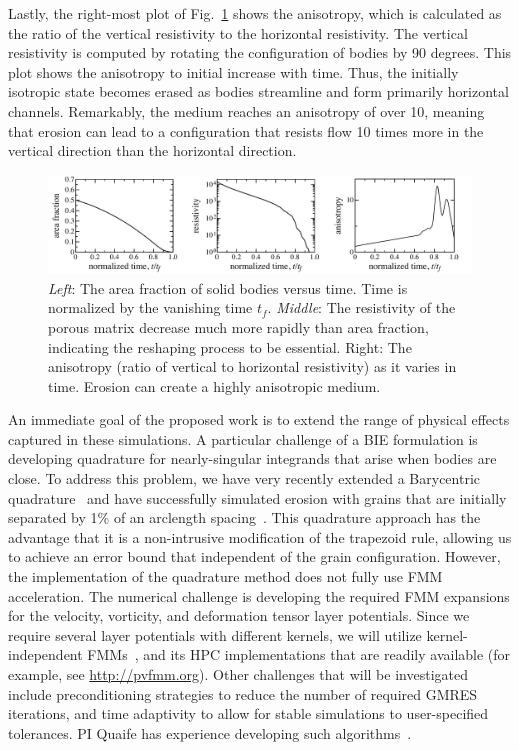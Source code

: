 \documentclass[11pt]{article}
\begin{document}
Lastly, the right-most plot of Fig.~\ref{fig3} shows the anisotropy, which is calculated as the ratio of the vertical resistivity to the horizontal resistivity. The vertical resistivity is computed by rotating the configuration of bodies by 90 degrees. This plot shows the anisotropy to initial increase with time. Thus, the initially isotropic state becomes erased as bodies streamline and form primarily horizontal channels. Remarkably, the medium reaches an anisotropy of over 10, meaning that erosion can lead to a configuration that resists flow 10 times more in the vertical direction than the horizontal direction.

\begin{figure}%
\begin{center}
\includegraphics[width = 0.99 \textwidth]{./figs/fig3.pdf}
  \caption{\label{fig3} {\em Left}: The area fraction of solid bodies versus time. Time is normalized by the vanishing time $t_f$. {\em Middle}: The resistivity of the porous matrix decrease much more rapidly than area fraction, indicating the reshaping process to be essential. Right: The anisotropy (ratio of vertical to horizontal resistivity) as it varies in time. Erosion can create a highly anisotropic medium.}
\end{center}
\end{figure}

{An immediate goal of the proposed work is to extend the range of physical effects captured in these simulations.} A particular challenge of a BIE formulation is developing quadrature for nearly-singular integrands that arise when bodies are close. To address this problem, we have very recently extended a Barycentric quadrature~\cite{bar2014, bar-wu-vee2015} and have successfully simulated erosion with grains that are initially separated by 1\% of an arclength spacing~\cite{chi-moo-qua2019}. This quadrature approach has the advantage that it is a non-intrusive modification of the trapezoid rule, allowing us to achieve an error bound that independent of the grain configuration. However, the implementation of the quadrature method does not fully use FMM acceleration. The numerical challenge is developing the required FMM expansions for the velocity, vorticity, and deformation tensor layer potentials. Since we require several layer potentials with different kernels, we will utilize kernel-independent FMMs~\cite{yin-bir-zor2004, fon-dar2009}, and its HPC implementations that are readily available (for example, see \url{http://pvfmm.org}). Other challenges that will be investigated include preconditioning strategies to reduce the number of required GMRES iterations, and time adaptivity to allow for stable simulations to user-specified tolerances. PI Quaife has experience developing such algorithms~\cite{qua-bir2015b, qua-bir2016, qua-bir2015a, qua-cou-dar2018}.
\end{document}
